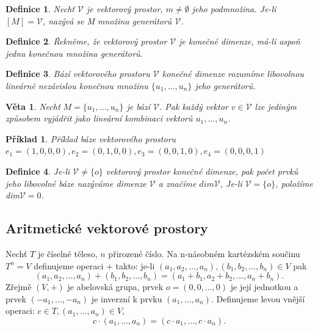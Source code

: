 \documentclass[12pt,a4paper]{article}
\newtheorem{definition}{Definice}
\newtheorem{sentence}{Věta}
\newtheorem{example}{Příklad}
\begin{document}
\begin{definition}
	Nechť  $\mathscr{V}$ je vektorový prostor, $m \not= \emptyset$ jeho podmnožina. Je-li $[M] =\mathscr{V}$, nazývá se M množina generátorů  $\mathscr{V}$.
\end{definition}

\begin{definition}
	Řekněme, že vektorový prostor $\mathscr{V}$ je konečné dimenze, má-li aspoň jednu konečnou množinu generátorů.
\end{definition}

\begin{definition}
	Bází vektorového prostoru $\mathscr{V}$ konečné dimenze rozumíme libovolnou lineárně nezávislou konečnou množinu $\{u_1, \dots, u_n\}$ jeho generátorů.
\end{definition}

\begin{sentence}
	Nechť $M = \{u_1, \dots, u_n\}$ je bází $\mathscr{V}$. Pak každý vektor $v \in \mathscr{V}$ lze jediným způsobem vyjádřit jako lineární kombinaci vektorů $u_1, \dots, u_n$.
\end{sentence}

\begin{example}
	Příklad báze vektorového prostoru $e_1 = (1,0,0,0), e_2 = (0,1,0,0), e_3 = (0,0,1,0), e_4 = (0,0,0,1)$
\end{example}

\begin{definition}
	Je-li $\mathscr{V} \not= \{o\}$  vektorový prostor konečné dimenze, pak počet prvků jeho libovolné báze nazýváme dimenze $\mathscr{V}$ a značíme $dim\mathscr{V}$, Je-li $\mathscr{V} = \{o\}$, položíme dim$\mathscr{V} = 0$.
\end{definition}


\subsection{Aritmetické vektorové prostory}
Nechť $T$ je číselné těleso, $n$ přirozené číslo. Na n-násobném kartézském součinu $T^n = V$ definujeme operaci $+$ takto: je-li $(a_1,a_2,\dots, a_n), (b_1,b_2,\dots, b_n) \in V$ pak $$(a_1,a_2,\dots, a_n) +(b_1,b_2,\dots, b_n) = (a_1 + b_1, a_2 + b_2,\dots, a_n + b_n).$$
Zřejmě $(V, +)$ je abelovská grupa, prvek $o = (0,0, \dots, 0)$ je její jednotkou a prvek $(- a_1, \dots, - a_n)$ je inverzní k prvku $(a_1, \dots, a_n)$. Definujeme levou vnější operaci: $c \in T, (a_1, \dots, a_n) \in V$, $$c \cdot (a_1,\dots, a_n) = (c \cdot a_1,\dots,c \cdot a_n).$$
\end{document}
